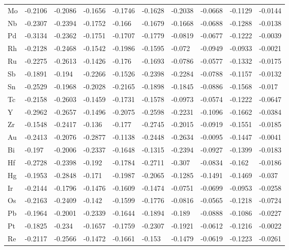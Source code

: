 \begin{table}[h]
{\begin{tabular}{*{10}{l}}
      Mo & -0.2106 & -0.2086 & -0.1656 & -0.1746 & -0.1628 & -0.2038 & -0.0668 & -0.1129 & -0.0144 \\
      Nb & -0.2307 & -0.2394 & -0.1752 & -0.166  & -0.1679 & -0.1668 & -0.0688 & -0.1288 & -0.0138 \\
      Pd & -0.3134 & -0.2362 & -0.1751 & -0.1707 & -0.1779 & -0.0819 & -0.0677 & -0.1222 & -0.0039 \\
      Rh & -0.2128 & -0.2468 & -0.1542 & -0.1986 & -0.1595 & -0.072  & -0.0949 & -0.0933 & -0.0021 \\
      Ru & -0.2275 & -0.2613 & -0.1426 & -0.176  & -0.1693 & -0.0786 & -0.0577 & -0.1332 & -0.0175 \\
      Sb & -0.1891 & -0.194  & -0.2266 & -0.1526 & -0.2398 & -0.2284 & -0.0788 & -0.1157 & -0.0132 \\
      Sn & -0.2529 & -0.1968 & -0.2028 & -0.2165 & -0.1898 & -0.1845 & -0.0886 & -0.1568 & -0.017  \\
      Tc & -0.2158 & -0.2603 & -0.1459 & -0.1731 & -0.1578 & -0.0973 & -0.0574 & -0.1222 & -0.0647 \\
      Y  & -0.2962 & -0.2657 & -0.1496 & -0.2075 & -0.2598 & -0.2231 & -0.1096 & -0.1662 & -0.0384 \\
      Zr & -0.1548 & -0.2417 & -0.136  & -0.177  & -0.2745 & -0.2015 & -0.0919 & -0.1551 & -0.0185 \\
      Au & -0.2413 & -0.2076 & -0.2877 & -0.1138 & -0.2448 & -0.2634 & -0.0095 & -0.1447 & -0.0041 \\
      Bi & -0.197  & -0.2006 & -0.2337 & -0.1648 & -0.1315 & -0.2394 & -0.0927 & -0.1399 & -0.0183 \\
      Hf & -0.2728 & -0.2398 & -0.192  & -0.1784 & -0.2711 & -0.307  & -0.0834 & -0.162  & -0.0186 \\
      Hg & -0.1953 & -0.2848 & -0.171  & -0.1987 & -0.2065 & -0.1285 & -0.1491 & -0.1469 & -0.037  \\
      Ir & -0.2144 & -0.1796 & -0.1476 & -0.1609 & -0.1474 & -0.0751 & -0.0699 & -0.0953 & -0.0258 \\
      Os & -0.2163 & -0.2409 & -0.142  & -0.1599 & -0.1776 & -0.0816 & -0.0565 & -0.1218 & -0.0724 \\
      Pb & -0.1964 & -0.2001 & -0.2339 & -0.1644 & -0.1894 & -0.189  & -0.0888 & -0.1086 & -0.0227 \\
      Pt & -0.1825 & -0.234  & -0.1657 & -0.1759 & -0.2307 & -0.1921 & -0.0612 & -0.1216 & -0.0022 \\
      Re & -0.2117 & -0.2566 & -0.1472 & -0.1661 & -0.153  & -0.1479 & -0.0619 & -0.1223 & -0.0261 \\

\end{tabular}}
\end{table}
